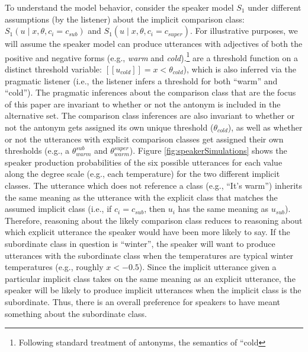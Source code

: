 \documentclass[doc]{apa6}
\begin{document}
To understand the model behavior, consider the speaker model \(S_1\)
under different assumptions (by the listener) about the implicit
comparison class: \(S_{1}(u \mid x, \theta, c_i = c_{sub})\) and
\(S_{1}(u \mid x, \theta, c_i = c_{super})\). For illustrative purposes,
we will assume the speaker model can produce utterances with adjectives
of both the positive and negative forms (e.g., \emph{warm} and
\emph{cold}).\footnote{Following standard treatment of antonyms, the
  semantics of ``cold} are a threshold function on a distinct
  threshold variable: \([\![u_{cold}]\!] = x < \theta_{cold}\)), which
  is also inferred via the pragmatic listener (i.e., the listener infers
  a threshold for both ``warm'' and ``cold''). The pragmatic
  inferences about the comparison class that are the focus of this paper
  are invariant to whether or not the antonym is included in the
  alternative set. The comparison class inferences are also invariant to
  whether or not the antonym gets assigned its own unique threshold
  (\(\theta_{cold}\)), as well as whether or not the utterances with
  explicit comparison classes get assigned their own thresholds (e.g., a
  \(\theta_{warm}^{sub}\) and \(\theta_{warm}^{super}\)). Figure
\ref{fig:speakerSimulations} shows the speaker production probabilities
of the six possible utterances for each value along the degree scale
(e.g., each temperature) for the two different implicit classes. The
utterance which does not reference a class (e.g., ``It's warm'')
inherits the same meaning as the utterance with the explicit class that
matches the assumed implicit class (i.e., if \(c_{i} = c_{sub}\), then
\(u_i\) has the same meaning as \(u_{sub}\)). Therefore, reasoning about
the likely comparison class reduces to reasoning about which explicit
utterance the speaker would have been more likely to say. If the
subordinate class in question is ``winter'', the speaker will want
to produce utterances with the subordinate class when the temperatures
are typical winter temperatures (e.g., roughly \(x < -0.5\)). Since the
implicit utterance given a particular implicit class takes on the same
meaning as an explicit utterance, the speaker will be likely to produce
implicit utterances when the implicit class is the subordinate. Thus,
there is an overall preference for speakers to have meant something
about the subordinate class.
\end{document}
